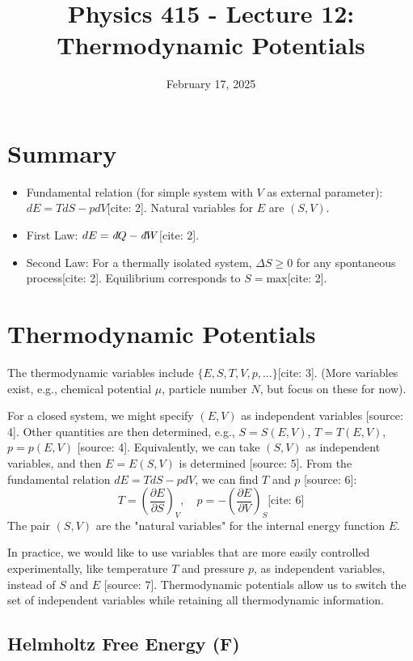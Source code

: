 \documentclass[11pt]{article}
\title{Physics 415 - Lecture 12: Thermodynamic Potentials}
\date{February 17, 2025}
\author{} %
\newcommand{\pderiv}[2]{\frac{\partial #1}{\partial #2}}
\newcommand{\ethbar}{\text{\it{đ}}} %
\begin{document}
\maketitle
\thispagestyle{empty}

\section*{Summary} %

\begin{itemize}
    \item Fundamental relation (for simple system with $V$ as external parameter): $dE = T dS - p dV$[cite: 2]. Natural variables for $E$ are $(S,V)$.
    \item First Law: $dE = \ethbar Q - \ethbar W$[cite: 2].
    \item Second Law: For a thermally isolated system, $\Delta S \ge 0$ for any spontaneous process[cite: 2]. Equilibrium corresponds to $S=\text{max}$[cite: 2].
\end{itemize}

\section*{Thermodynamic Potentials} %

The thermodynamic variables include $\{E, S, T, V, p, \dots\}$[cite: 3]. (More variables exist, e.g., chemical potential $\mu$, particle number $N$, but focus on these for now).

For a closed system, we might specify $(E, V)$ as independent variables [source: 4]. Other quantities are then determined, e.g., $S=S(E,V)$, $T=T(E,V)$, $p=p(E,V)$ [source: 4].
Equivalently, we can take $(S,V)$ as independent variables, and then $E=E(S,V)$ is determined [source: 5]. From the fundamental relation $dE = T dS - p dV$, we can find $T$ and $p$ [source: 6]:
\[ T = \left( \pderiv{E}{S} \right)_V, \quad p = -\left( \pderiv{E}{V} \right)_S \text{[cite: 6]} \]
The pair $(S,V)$ are the "natural variables" for the internal energy function $E$.

In practice, we would like to use variables that are more easily controlled experimentally, like temperature $T$ and pressure $p$, as independent variables, instead of $S$ and $E$ [source: 7]. Thermodynamic potentials allow us to switch the set of independent variables while retaining all thermodynamic information.

\subsection*{Helmholtz Free Energy (F)} %
\end{document}
